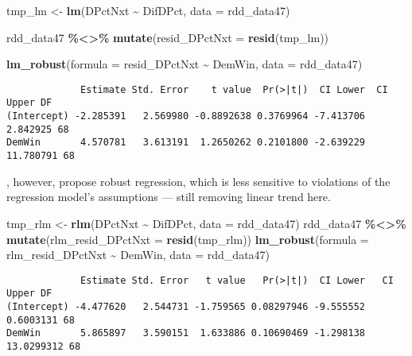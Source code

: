 \documentclass[
  12pt,
  leqno]{article}
\newenvironment{Shaded}{\begin{snugshade}}{\end{snugshade}}
\newcommand{\AttributeTok}[1]{\textcolor[rgb]{0.13,0.29,0.53}{#1}}
\newcommand{\FunctionTok}[1]{\textcolor[rgb]{0.13,0.29,0.53}{\textbf{#1}}}
\newcommand{\NormalTok}[1]{#1}
\newcommand{\OtherTok}[1]{\textcolor[rgb]{0.56,0.35,0.01}{#1}}
\newcommand{\SpecialCharTok}[1]{\textcolor[rgb]{0.81,0.36,0.00}{\textbf{#1}}}
\begin{document}
\scriptsize

\begin{Shaded}
\begin{Highlighting}[]
\NormalTok{tmp\_lm }\OtherTok{\textless{}{-}} \FunctionTok{lm}\NormalTok{(DPctNxt }\SpecialCharTok{\textasciitilde{}}\NormalTok{ DifDPct, }\AttributeTok{data =}\NormalTok{ rdd\_data47)}

\NormalTok{rdd\_data47 }\SpecialCharTok{\%\textless{}\textgreater{}\%}
    \FunctionTok{mutate}\NormalTok{(}\AttributeTok{resid\_DPctNxt =} \FunctionTok{resid}\NormalTok{(tmp\_lm))}

\FunctionTok{lm\_robust}\NormalTok{(}\AttributeTok{formula =}\NormalTok{ resid\_DPctNxt }\SpecialCharTok{\textasciitilde{}}\NormalTok{ DemWin, }\AttributeTok{data =}\NormalTok{ rdd\_data47)}
\end{Highlighting}
\end{Shaded}

\begin{verbatim}
             Estimate Std. Error    t value  Pr(>|t|)  CI Lower  CI Upper DF
(Intercept) -2.285391   2.569980 -0.8892638 0.3769964 -7.413706  2.842925 68
DemWin       4.570781   3.613191  1.2650262 0.2101800 -2.639229 11.780791 68
\end{verbatim}

\normalsize

\citet{saleshansen2020}, however, propose robust regression, which is
less sensitive to violations of the regression model's assumptions ---
still removing linear trend here.

\scriptsize

\begin{Shaded}
\begin{Highlighting}[]
\NormalTok{tmp\_rlm }\OtherTok{\textless{}{-}} \FunctionTok{rlm}\NormalTok{(DPctNxt }\SpecialCharTok{\textasciitilde{}}\NormalTok{ DifDPct, }\AttributeTok{data =}\NormalTok{ rdd\_data47)}
\NormalTok{rdd\_data47 }\SpecialCharTok{\%\textless{}\textgreater{}\%}
    \FunctionTok{mutate}\NormalTok{(}\AttributeTok{rlm\_resid\_DPctNxt =} \FunctionTok{resid}\NormalTok{(tmp\_rlm))}
\FunctionTok{lm\_robust}\NormalTok{(}\AttributeTok{formula =}\NormalTok{ rlm\_resid\_DPctNxt }\SpecialCharTok{\textasciitilde{}}\NormalTok{ DemWin, }\AttributeTok{data =}\NormalTok{ rdd\_data47)}
\end{Highlighting}
\end{Shaded}

\begin{verbatim}
             Estimate Std. Error   t value   Pr(>|t|)  CI Lower   CI Upper DF
(Intercept) -4.477620   2.544731 -1.759565 0.08297946 -9.555552  0.6003131 68
DemWin       5.865897   3.590151  1.633886 0.10690469 -1.298138 13.0299312 68
\end{verbatim}
\end{document}
